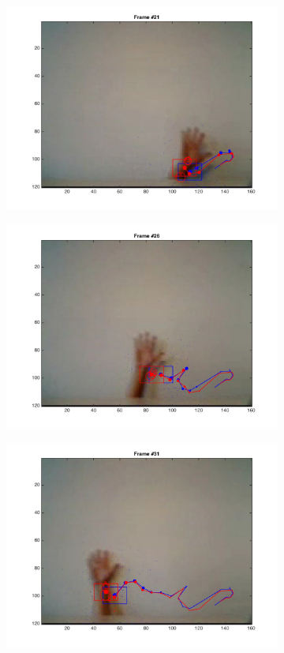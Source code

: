 \documentclass{ethz_report}
\begin{document}
\begin{figure}[H]
\begin{subfigure}[b]{.25\textwidth}
        \includegraphics[width=1\linewidth]{images/video1_11}
    \end{subfigure}%
    \begin{subfigure}[b]{.25\textwidth}
        \centering
        \includegraphics[width=1\linewidth]{images/video1_16}
    \end{subfigure}
    \begin{subfigure}[b]{.25\textwidth}
        \centering
        \includegraphics[width=1\linewidth]{images/video1_21}

\end{subfigure}
\end{figure}
\end{document}
